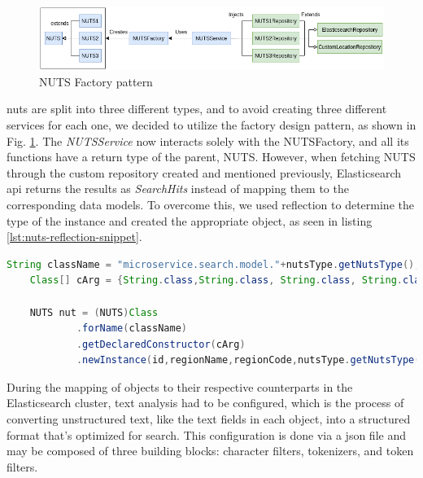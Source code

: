 \begin{figure}[h]
    \centering 
    \includegraphics[width=1\textwidth]{Chapters/img/backend/nuts-es-horizontal.png}
    \caption{NUTS Factory pattern} 
    \label{fig:nuts-factory-pattern}
\end{figure}

\acrshort{nuts} are split into three different types, and to avoid creating three different services for each one, we decided to utilize the factory design pattern, as shown in Fig. \ref{fig:nuts-factory-pattern}. The \textit{NUTSService} now interacts solely with the NUTSFactory, and all its functions have a return type of the parent, NUTS. However, when fetching NUTS through the custom repository created and mentioned previously, Elasticsearch \acrshort{api} returns the results as \textit{SearchHits} instead of mapping them to the corresponding data models. To overcome this, we used reflection to determine the type of the instance and created the appropriate object, as seen in listing \ref{lst:nuts-reflection-snippet}. \\

\begin{lstlisting}[float, language = Java, caption={NUTS reflection snippet}, label={lst:nuts-reflection-snippet}, captionpos=t]
    String className = "microservice.search.model."+nutsType.getNutsType();
    Class[] cArg = {String.class,String.class, String.class, String.class};

    NUTS nut = (NUTS)Class
            .forName(className)
            .getDeclaredConstructor(cArg)
            .newInstance(id,regionName,regionCode,nutsType.getNutsType());
\end{lstlisting}

During the mapping of objects to their respective counterparts in the Elasticsearch cluster, text analysis had to be configured, which is the process of converting unstructured text, like the text fields in each object, into a structured format that's optimized for search. This configuration is done via a \acrshort{json} file and may be composed of three building blocks: character filters, tokenizers, and token filters.


